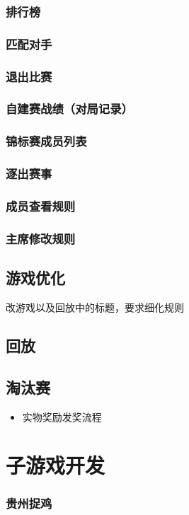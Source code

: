 \documentclass[11pt]{article}
\begin{document}
\subsubsection{排行榜}
\label{sec:org2d7bf4e}
\subsubsection{匹配对手}
\label{sec:org4545541}
\subsubsection{退出比赛}
\label{sec:orge840859}
\subsubsection{自建赛战绩（对局记录）}
\label{sec:orgd67a5fe}
\subsubsection{锦标赛成员列表}
\label{sec:org1922c47}
\subsubsection{逐出赛事}
\label{sec:org2cf4706}
\subsubsection{成员查看规则}
\label{sec:orgb5c9ca7}
\subsubsection{主席修改规则}
\label{sec:orga94cb92}


\subsection{游戏优化}
\label{sec:orgf162394}
改游戏以及回放中的标题，要求细化规则
\subsection{回放}
\label{sec:orga7aeb60}
\subsection{淘汰赛}
\label{sec:org0307266}
\begin{itemize}
\item 实物奖励发奖流程
\end{itemize}


\section{子游戏开发}
\label{sec:orgaf16d21}
\subsubsection{贵州捉鸡}
\label{sec:org66c81d6}
\end{document}
